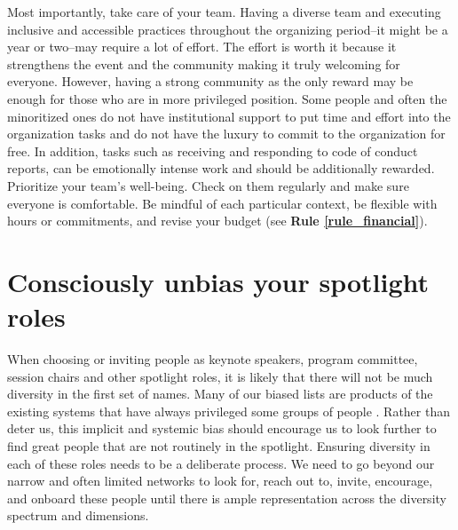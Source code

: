 \documentclass[10pt,letterpaper]{article}
\begin{document}
Most importantly, take care of your team. 
Having a diverse team and executing inclusive and accessible practices throughout the organizing period--it might be a year or two--may require a lot of effort. The effort is worth it because it strengthens the event and the community making it truly welcoming for everyone. 
However, having a strong community as the only reward may be enough for those who are in more privileged position. 
Some people and often the minoritized ones do not have institutional support to put time and effort into the organization tasks and do not have the luxury to commit to the organization for free. 
In addition, tasks such as receiving and responding to code of conduct reports, can be emotionally intense work and should be additionally rewarded.
Prioritize your team's well-being. Check on them regularly and make sure everyone is comfortable. 
Be mindful of each particular context, be flexible with hours or commitments, and revise your budget (see \textbf{Rule \ref{rule_financial}}). 


\section{Consciously unbias your spotlight roles}
\label{rule_unbias}

When choosing or inviting people as keynote speakers, program committee, session chairs and other spotlight roles, it is likely that there will not be much diversity in the first set of names. Many of our biased lists are products of the existing systems that have always privileged some groups of people \cite{dwyerNoticeWhoScience2021,swartzScienceValueDiversity2019,wongBuildDiversityScience2020,dignazioUnicornsJanitorsNinjas2020}. Rather than deter us, this implicit and systemic bias should encourage us to look further to find great people that are not routinely in the spotlight. 
Ensuring diversity in each of these roles needs to be a deliberate process. We need to go beyond our narrow and often limited networks to look for, reach out to, invite, encourage, and onboard these people until there is ample representation across the diversity spectrum and dimensions. 
\end{document}
